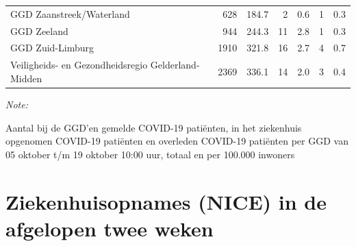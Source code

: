 \documentclass[
  english,
  man,floatsintext]{apa6}
\begin{document}
\begin{table}
\begin{threeparttable}
\begin{tabular}{lrrrrrr}
GGD Zaanstreek/Waterland & 628 & 184.7 & 2 & 0.6 & 1 & 0.3\\
GGD Zeeland & 944 & 244.3 & 11 & 2.8 & 1 & 0.3\\
GGD Zuid-Limburg & 1910 & 321.8 & 16 & 2.7 & 4 & 0.7\\
Veiligheids- en Gezondheidsregio Gelderland-Midden & 2369 & 336.1 & 14 & 2.0 & 3 & 0.4\\
\bottomrule
\end{tabular}
\begin{tablenotes}
\item \textit{Note: } 
\item Aantal bij de GGD’en gemelde COVID-19 patiënten, in het ziekenhuis opgenomen COVID-19 patiënten en overleden COVID-19 patiënten per GGD van 05 oktober t/m 19 oktober 10:00 uur, totaal en per 100.000 inwoners
\end{tablenotes}
\end{threeparttable}
\endgroup{}
\end{table}

\newpage

\hypertarget{ziekenhuisopnames-nice-in-de-afgelopen-twee-weken}{%
\section{Ziekenhuisopnames (NICE) in de afgelopen twee weken}\label{ziekenhuisopnames-nice-in-de-afgelopen-twee-weken}}
\end{document}
